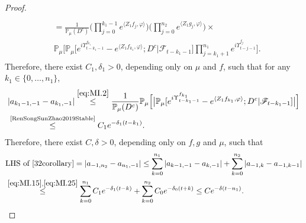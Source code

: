\documentclass[12pt,a4paper]{amsart}
\theoremstyle{plain}
\theoremstyle{definition}
\numberwithin{equation}{section}
\begin{document}
\begin{proof}
\begin{align}
	\\& \label{eq:MI.2}\begin{multlined}
	=  \frac{1}{\mathbb P_\mu(D^c)} \Big(\prod_{j=0}^{k_1-1}e^{\langle Z_1 f_j, \varphi\rangle}\Big) \Big(\prod_{j=0}^{n_2} e^{ \langle Z_1g_j,\varphi \rangle} \Big) \times {}
	\\ \mathbb{P}_{\mu}\Big[ \mathbb P_\mu\big[e^{i\Upsilon_{t-k_1-1}^{f_{k_1}}} -e^{\langle Z_1 f_{k_1}, \varphi\rangle}  ; D^c \big| \mathscr F_{t-k_1 - 1}\big] \prod_{j=k_1+1}^{n_1} e^{i\Upsilon_{t-j-1}^{f_j}} \Big] .
	\end{multlined}
	\end{align}
	Therefore,  there exist $C_1,\delta_1 >0$, depending only on $\mu$ and $f$, 
	such that for any $k_1 \in \{0,\dots,n_1\}$,
\begin{align}
    &| a_{k_1-1,-1} - a_{k_1,-1}|
    \overset{\eqref{eq:MI.2}}\leq \frac{1}{\mathbb{P}_{\mu}(D^c)}\mathbb{P}_{\mu}\Big[\big|\mathbb P_\mu[e^{i\Upsilon^{f_{k_1}}_{t-k_1-1}}-e^{\langle Z_1f_{k_1}, \varphi\rangle}; D^c|\mathscr F_{t-k_1-1}]\big|\Big]
    \\&\label{eq:MI.25}\overset{\text{\cite[Proposition 3.5]{RenSongSunZhao2019Stable}}}\leq C_1 e^{-\delta_1 (t-k_1)}.
\end{align}
  Therefore, there exist $C,\delta >0$, depending only on $f,g$ and $\mu$, such that
  \begin{align}
    &\text{LHS of \eqref{32corollary}}
    = \left|a_{-1,n_2}-a_{n_1,-1}\right|
      \leq \sum_{k=0}^{n_1}\left|a_{k-1,-1}-a_{k,-1}\right|+\sum_{k=0}^{n_2}\left|a_{-1,k}-a_{-1,k-1}\right|\\
     & \overset{\eqref{eq:MI.15},\eqref{eq:MI.25}}\leq \sum_{k=0}^{n_1} C_1 e^{-\delta_1 (t-k)}+\sum_{k=0}^{n_2} C_0 e^{-\delta_0 (t+k)}
      \leq C e^{- \delta (t-n_1)}.
      \qedhere
  \end{align}
\end{proof}
\end{document}
